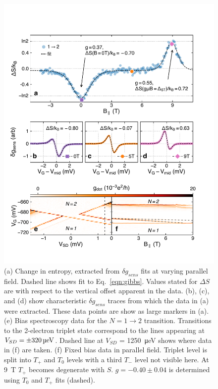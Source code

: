 \documentclass[twocolumn,showpacs,amsmath,amssymb,prl,aps,superscriptaddress]{revtex4-1}
\begin{document}
\begin{figure}
        \includegraphics[width=1.0\columnwidth]{../figures/figure_4.pdf}
        \caption{\label{fig:fig4}(a) Change in entropy, extracted from $\delta g_{sens}$ fits at varying parallel field. Dashed line shows fit to Eq.~\ref{eqn:gibbs}. Values stated for $\Delta S$ are with respect to the vertical offset apparent in the data. (b), (c), and (d) show characteristic $\delta g_{sens}$ traces from which the data in (a) were extracted. These data points are show as large markers in (a). (e) Bias spectroscopy data for the $N=1 \rightarrow 2$ transition. Transitions to the 2-electron triplet state correspond to the lines appearing at $V_{SD} = \SI{\pm 320}{\micro\electronvolt}$. Dashed line at $V_{SD}$ = \SI{1250}{\micro\electronvolt} shows where data in (f) are taken. (f) Fixed bias data in parallel field. Triplet level is split into $\mathit{T_+}$ and $\mathit{T_0}$ levels with a third $\mathit{T_-}$ level not visible here. At \SI[input-protect-tokens]{9}{\tesla} $\mathit{T_+}$ becomes degenerate with $\mathit{S}$. $g=-0.40\pm0.04$ is determined using $\mathit{T_0}$ and $\mathit{T_+}$ fits (dashed).}
\end{figure}
\end{document}
